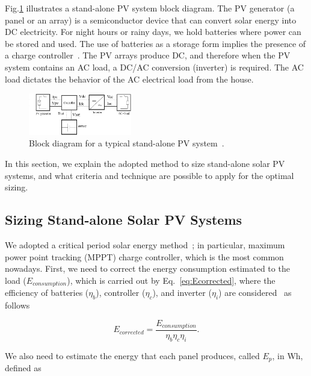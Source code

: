 \documentclass[journal]{IEEEtran}
\begin{document}
Fig.\ref{fig:blockdiagram} illustrates a stand-alone PV system block diagram. The PV generator (a panel or an array) is a semiconductor device that can convert solar energy into DC electricity. For night hours or rainy days, we hold batteries where power can be stored and used. The use of batteries as a storage form implies the presence of a charge controller~\cite{Hansen}. The PV arrays produce DC, and therefore when the PV system contains an AC load, a DC/AC conversion (inverter) is required. The AC load dictates the behavior of the AC electrical load from the house.
%
\begin{figure}[h]
\includegraphics[width=0.4\textwidth]{blockdiagramPVS2_rev}
\centering
\caption{Block diagram for a typical stand-alone PV system~\cite{Hansen}.}
\label{fig:blockdiagram} 
\end{figure}

In this section, we explain the adopted method to size stand-alone solar PV systems, and what criteria and technique are possible to apply for the optimal sizing. 

\subsection{Sizing Stand-alone Solar PV Systems}
\label{sec:sizing}

We adopted a critical period solar energy method~\cite{Pinho}; in particular, maximum power point tracking (MPPT) charge controller, which is the most common nowadays. First, we need to correct the energy consumption estimated to the load ($E_{consumption}$), which is carried out by Eq.~\eqref{eq:Ecorrected}, where the efficiency of batteries ($\eta_{b}$), controller ($\eta_{c}$), and inverter ($\eta_{i}$) are considered~\cite{Pinho} as follows

\begin{equation}
\label{eq:Ecorrected}
E_{corrected} = \dfrac{E_{consumption}}{\eta_{b} \eta_{c} \eta_{i} }.
\end{equation}

We also need to estimate the energy that each panel produces, called $E_{p}$, in Wh, defined as
\end{document}
